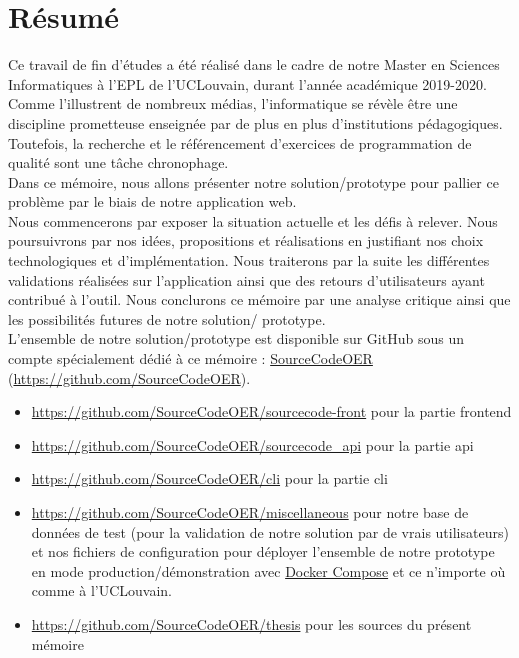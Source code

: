 \chapter*{Résumé}

Ce travail de fin d'études a été réalisé dans le cadre de notre Master en Sciences Informatiques à l'EPL de l'UCLouvain, durant l'année académique 2019-2020.\\

Comme l'illustrent de nombreux médias, l'informatique se révèle être une discipline prometteuse enseignée par de plus en plus d'institutions pédagogiques. Toutefois, la recherche et le référencement d'exercices de programmation de qualité sont une tâche chronophage.\\

Dans ce mémoire, nous allons présenter notre solution/prototype pour pallier ce problème par le biais de notre application web.\\

Nous commencerons par exposer la situation actuelle et les défis à relever. Nous poursuivrons par nos idées, propositions et réalisations en justifiant nos choix technologiques et d'implémentation. Nous traiterons par la suite les différentes validations réalisées sur l'application ainsi que des retours d'utilisateurs ayant contribué à l'outil. Nous conclurons ce mémoire par une analyse critique ainsi que les possibilités futures de notre solution/ prototype. \\

L'ensemble de notre solution/prototype est disponible sur GitHub sous un compte spécialement dédié à ce mémoire : 
\href{https://github.com/SourceCodeOER}{SourceCodeOER} (\href{https://github.com/SourceCodeOER}{https://github.com/SourceCodeOER}).

\begin{itemize}
    \item \href{https://github.com/SourceCodeOER/sourcecode-front}{https://github.com/SourceCodeOER/sourcecode-front} pour la partie \gls{frontend}
    \item \href{https://github.com/SourceCodeOER/sourcecode\_api}{https://github.com/SourceCodeOER/sourcecode\_api} pour la partie \Gls{api}
    \item \href{https://github.com/SourceCodeOER/cli}{https://github.com/SourceCodeOER/cli} pour la partie \Gls{cli}
    \item \href{https://github.com/SourceCodeOER/miscellaneous}{https://github.com/SourceCodeOER/miscellaneous} pour notre base de données de test (pour la validation de notre solution par de vrais utilisateurs) et nos fichiers de configuration pour déployer l'ensemble de notre prototype en mode production/démonstration avec \href{https://docs.docker.com/compose/}{Docker Compose} et ce n'importe où comme à l'UCLouvain.
    \item \href{https://github.com/SourceCodeOER/thesis}{https://github.com/SourceCodeOER/thesis} pour les sources du présent mémoire
\end{itemize}

